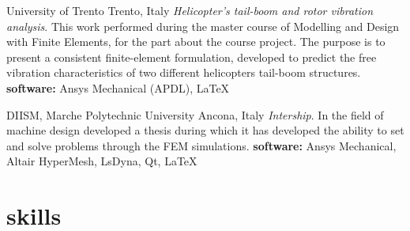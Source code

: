 \documentclass[a4,oneside]{friggeri-cv} %
\begin{document}
\begin{entrylist}     
    {University of Trento}
    {Trento, Italy}
    {\emph{Helicopter's tail-boom and rotor vibration analysis}.}
    {This work performed during the master course of Modelling and Design with
Finite Elements, for the part about the course project. The purpose is to
present a consistent finite-element formulation, developed to predict the free
vibration characteristics of two different helicopters tail-boom structures.}
    {\textbf{software: } Ansys Mechanical (APDL), \LaTeX}
    {\href{https://github.com/frank1789/FEM-Analysis---Helicopter-s-Tail}{\faGithub}}
      
      
    {DIISM, Marche Polytechnic University}
    {Ancona, Italy}
    {\emph{Intership}.}
    {In the field of machine design developed a thesis during which it has
    developed the ability to set and solve problems through the FEM
    simulations.}
    {\textbf{software: } Ansys Mechanical, Altair  HyperMesh, LsDyna, Qt, \LaTeX}
    {\href{https://github.com/frank1789/LsDynaToAPDL}{\faGithub}}
      
    
  \end{entrylist}

\section{skills}
	\begin{entrylist} 
		
		\\
		
		
		\\
		
	\end{entrylist}

\end{document}
